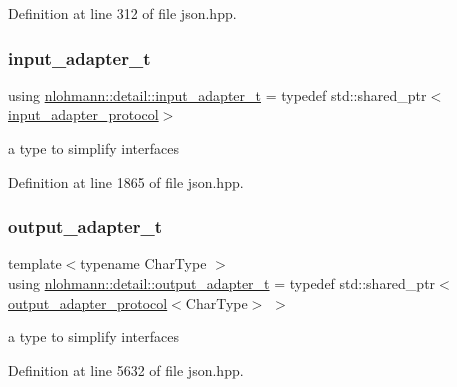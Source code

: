 Definition at line 312 of file json.\+hpp.

\mbox{\label{namespacenlohmann_1_1detail_ae132f8cd5bb24c5e9b40ad0eafedf1c2}} 
\subsubsection{\texorpdfstring{input\+\_\+adapter\+\_\+t}{input\_adapter\_t}}
{\footnotesize\ttfamily using \hyperlink{namespacenlohmann_1_1detail_ae132f8cd5bb24c5e9b40ad0eafedf1c2}{nlohmann\+::detail\+::input\+\_\+adapter\+\_\+t} = typedef std\+::shared\+\_\+ptr$<$\hyperlink{structnlohmann_1_1detail_1_1input__adapter__protocol}{input\+\_\+adapter\+\_\+protocol}$>$}



a type to simplify interfaces 



Definition at line 1865 of file json.\+hpp.

\mbox{\label{namespacenlohmann_1_1detail_a9b680ddfb58f27eb53a67229447fc556}} 
\subsubsection{\texorpdfstring{output\+\_\+adapter\+\_\+t}{output\_adapter\_t}}
{\footnotesize\ttfamily template$<$typename Char\+Type $>$ \\
using \hyperlink{namespacenlohmann_1_1detail_a9b680ddfb58f27eb53a67229447fc556}{nlohmann\+::detail\+::output\+\_\+adapter\+\_\+t} = typedef std\+::shared\+\_\+ptr$<$\hyperlink{structnlohmann_1_1detail_1_1output__adapter__protocol}{output\+\_\+adapter\+\_\+protocol}$<$Char\+Type$>$ $>$}



a type to simplify interfaces 



Definition at line 5632 of file json.\+hpp.

\mbox{\label{namespacenlohmann_1_1detail_a53a082eedad9f4729fcd8fed552a21f7}} 
